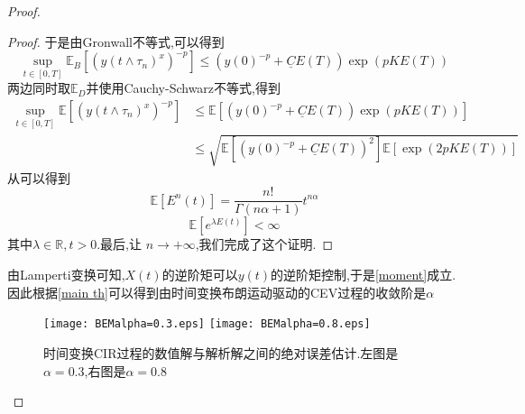 \begin{proof}
\begin{proof}
		于是由Gronwall不等式,可以得到
		$$\sup\limits_{t\in[0,T]}\mathbb{E}_B\left[(y(t\wedge\tau_n)^x)^{-p}\right]\leq\left(y(0)^{-p}+\underline{C}E(T)\right)\exp(pKE(T))$$
		两边同时取$\mathbb{E}_D$并使用Cauchy-Schwarz不等式,得到
		$$\begin{aligned}
			\sup\limits_{t\in[0,T]}\mathbb{E}\left[(y(t\wedge\tau_n)^x)^{-p}\right]&\leq\mathbb{E}\left[\left(y(0)^{-p}+\underline{C}E(T)\right)\exp(pKE(T))\right]\\
			&\leq\sqrt{\mathbb{E}\left[\left(y(0)^{-p}+\underline{C}E(T)\right)^2\right]\mathbb{E}\left[\exp(2pKE(T))\right]}
		\end{aligned}$$
		从\cite{jum2014strong}可以得到
		\begin{equation}
			\mathbb{E}[E^n(t)]=\frac{n!}{\Gamma(n\alpha+1)}t^{n\alpha}
		\end{equation}
		\begin{equation}
			\mathbb{E}[e^{\lambda E(t)}]<\infty
		\end{equation}
		其中$\lambda \in \mathbb{R},t>0$.最后,让 $n\to+\infty$,我们完成了这个证明.
	\end{proof}
	
	
	由Lamperti变换可知,$X(t)$的逆阶矩可以$y(t)$的逆阶矩控制,于是\cref{moment}成立.因此根据\cref{main th}可以得到由时间变换布朗运动驱动的CEV过程的收敛阶是$\alpha$
	\
	
	\begin{figure}[htp!]
		\centering
		\texttt{[image: BEMalpha=0.3.eps]}
		\hfill
		\texttt{[image: BEMalpha=0.8.eps]}
		\caption{时间变换CIR过程的数值解与解析解之间的绝对误差估计.左图是$\alpha=0.3$,右图是$\alpha=0.8$}
		\label{fig:image}
		\vspace{-2ex}
	\end{figure}
	
	
	
	
\end{proof}
